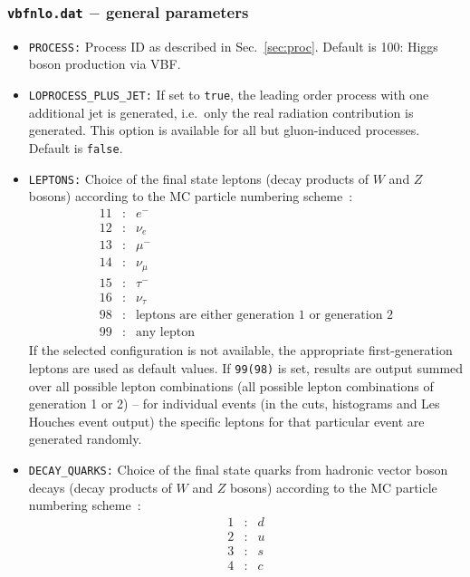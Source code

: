 \documentclass[english,12pt]{article}
\begin{document}
\subsubsection{{\tt vbfnlo.dat} $-$ general parameters}
\label{sec:general}
\begin{itemize}
\item {\tt PROCESS:} Process ID as described in Sec.~\ref{sec:proc}.  Default is
100: Higgs boson production via VBF.

\item {\tt LOPROCESS\_PLUS\_JET:} If set to {\tt true}, the leading order
  process with one additional jet is generated, i.e.\ only the real radiation
	contribution is generated.  This option is available for all but gluon-induced processes.
	Default is {\tt false}.
\item{\tt LEPTONS:} Choice of the final state leptons (decay products of $W$ and
$Z$ bosons) according to the MC particle numbering scheme~\cite{Amsler:2008zz}:
\begin{eqnarray}
11 &:& e^{-} \nonumber \\
12 &:& \nu_{e} \nonumber \\ 
13 &:& \mu^{-} \nonumber \\
14 &:& \nu_{\mu} \nonumber \\ 
15 &:& \tau^{-} \nonumber \\
16 &:& \nu_{\tau} \nonumber \\
98 &:& \mbox{leptons are either generation 1 or generation 2} \nonumber \\
99 &:& \mbox{any lepton} \nonumber
\end{eqnarray}
If the selected configuration is not available, the appropriate first-generation
leptons are used as default values.  If {\tt 99(98)} is set, results are output
summed over all possible lepton combinations (all possible lepton combinations
of generation 1 or 2) -- for individual events (in the cuts, histograms and Les
Houches event output) the specific leptons for that particular event are
generated randomly.  
\item{\tt DECAY\_QUARKS:} Choice of the final state quarks from hadronic vector boson decays
(decay products of $W$ and $Z$ bosons) according to the MC particle numbering scheme~\cite{Amsler:2008zz}:
\begin{eqnarray}
1 &:& d \nonumber \\
2 &:& u \nonumber \\ 
3 &:& s \nonumber \\
4 &:& c \nonumber \\ 

\end{eqnarray}
\end{itemize}
\end{document}
